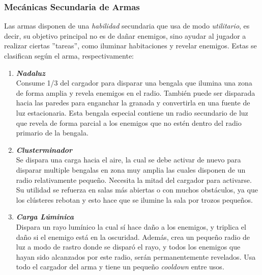     \subsubsection{Mecánicas Secundaria de Armas} \label{mecanicasSecundarias}
        Las armas disponen de una \textit{habilidad} secundaria que usa de modo \textit{utilitario}, es decir, su objetivo principal no es de dañar enemigos, sino ayudar al jugador a realizar ciertas ''tareas'', como iluminar habitaciones y revelar enemigos.
        Estas se clasifican según el arma, respectivamente:
        \begin{enumerate}
            \item \textbf{\textit{Nadaluz}} \\
                Consume 1/3 del cargador para disparar una bengala que ilumina una zona de forma amplia y revela enemigos en el radio. También puede ser disparada hacia las paredes para enganchar la granada y convertirla en una fuente de luz estacionaria.
                Esta bengala especial contiene un radio secundario de luz que revela de forma parcial a los enemigos que no estén dentro del radio primario de la bengala.
            \item \textbf{\textit{Clusterminador}} \\
                Se dispara una carga hacia el aire, la cual se debe activar de nuevo para disparar multiple bengalas en zona muy amplia las cuales disponen de un radio relativamente pequeño. Necesita la mitad del cargador para activarse.
                Su utilidad se refuerza en salas más abiertas o con muchos obstáculos, ya que los clústeres rebotan y esto hace que se ilumine la sala por trozos pequeños.
            \item \textbf{\textit{Carga Lúminica}} \\
                Dispara un rayo lumínico la cual sí hace daño a los enemigos, y triplica el daño si el enemigo está en la oscuridad. Además, crea un pequeño radio de luz a modo de rastro donde se disparó el rayo, y todos los enemigos que hayan sido alcanzados por este radio, serán permanentemente revelados.
                Usa todo el cargador del arma y tiene un pequeño \textit{cooldown} entre usos.
        \end{enumerate}

